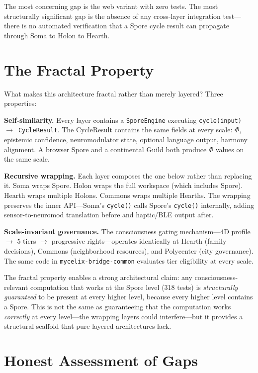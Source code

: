 \documentclass[11pt,twocolumn]{article}
\begin{document}
The most concerning gap is the web variant with zero tests. The most structurally significant gap is the absence of any cross-layer integration test---there is no automated verification that a Spore cycle result can propagate through Soma to Holon to Hearth.

\section{The Fractal Property}
\label{sec:fractal}

What makes this architecture fractal rather than merely layered? Three properties:

\textbf{Self-similarity.} Every layer contains a \texttt{SporeEngine} executing \texttt{cycle(input) $\to$ CycleResult}. The CycleResult contains the same fields at every scale: $\Phi$, epistemic confidence, neuromodulator state, optional language output, harmony alignment. A browser Spore and a continental Guild both produce $\Phi$ values on the same scale.

\textbf{Recursive wrapping.} Each layer composes the one below rather than replacing it. Soma wraps Spore. Holon wraps the full workspace (which includes Spore). Hearth wraps multiple Holons. Commons wraps multiple Hearths. The wrapping preserves the inner API---Soma's \texttt{cycle()} calls Spore's \texttt{cycle()} internally, adding sensor-to-neuromod translation before and haptic/BLE output after.

\textbf{Scale-invariant governance.} The consciousness gating mechanism---4D profile $\to$ 5 tiers $\to$ progressive rights---operates identically at Hearth (family decisions), Commons (neighborhood resources), and Polycenter (city governance). The same code in \texttt{mycelix-bridge-common} evaluates tier eligibility at every scale.

The fractal property enables a strong architectural claim: any consciousness-relevant computation that works at the Spore level (318 tests) is \textit{structurally guaranteed} to be present at every higher level, because every higher level contains a Spore. This is not the same as guaranteeing that the computation works \textit{correctly} at every level---the wrapping layers could interfere---but it provides a structural scaffold that pure-layered architectures lack.

\section{Honest Assessment of Gaps}
\label{sec:gaps}
\end{document}
